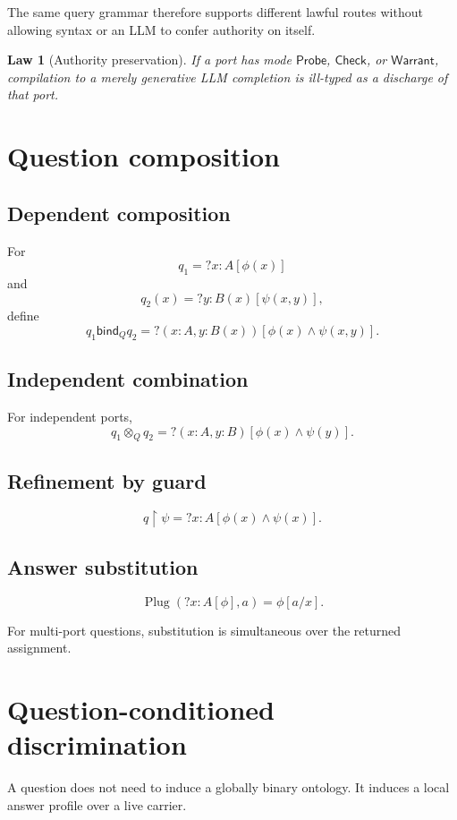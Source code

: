 \documentclass[11pt,oneside]{article}
\newtheorem{law}[definition]{Law}
\newcommand{\bind}{\mathbin{\mathsf{bind}}}
\begin{document}
The same query grammar therefore supports different lawful routes without allowing syntax or an LLM to confer authority on itself.

\begin{law}[Authority preservation]
If a port has mode \(\mathsf{Probe}\), \(\mathsf{Check}\), or \(\mathsf{Warrant}\), compilation to a merely generative LLM completion is ill-typed as a discharge of that port.
\end{law}

\section{Question composition}

\subsection{Dependent composition}

For
\[
q_1=?x:A[\phi(x)]
\]
and
\[
q_2(x)=?y:B(x)[\psi(x,y)],
\]
define
\[
\boxed{
q_1\bind_{\!Q} q_2
=
?(x:A,y:B(x))[
\phi(x)\land\psi(x,y)
].
}
\]

\subsection{Independent combination}

For independent ports,
\[
\boxed{
q_1\otimes_Q q_2
=
?(x:A,y:B)[
\phi(x)\land\psi(y)
].
}
\]

\subsection{Refinement by guard}

\[
\boxed{
q\upharpoonright\psi
=
?x:A[
\phi(x)\land\psi(x)
].
}
\]

\subsection{Answer substitution}

\[
\boxed{
\operatorname{Plug}(?x:A[\phi],a)
=
\phi[a/x].
}
\]

For multi-port questions, substitution is simultaneous over the returned assignment.

\section{Question-conditioned discrimination}

A question does not need to induce a globally binary ontology.  It induces a local answer profile over a live carrier.
\end{document}
